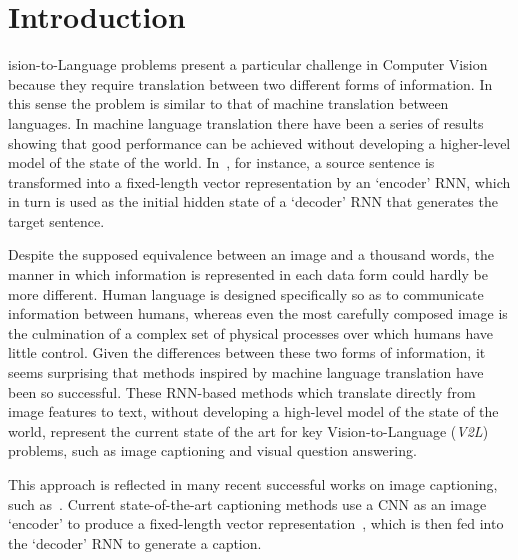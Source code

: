 \documentclass[10pt,journal,compsoc]{IEEEtran}
\def\V2L{\textit{V2L}}
\begin{document}
\IEEEdisplaynontitleabstractindextext
\IEEEpeerreviewmaketitle



\section{Introduction}
\label{sec:introduction}
ision-to-Language problems present a particular challenge in Computer Vision because they require translation between two different forms of information.  In this sense the problem is similar to that of machine translation between languages. In machine language translation there have been a series of results showing that good performance can be achieved without developing a higher-level model of the state of the world. In~\cite{bahdanau2014neural,cho2014learning,sutskever2014sequence}, for instance, a source sentence is transformed into a fixed-length vector representation by an `encoder' RNN, which in turn is used as the initial hidden state of a `decoder' RNN that generates the target sentence.

Despite the supposed equivalence between an image and  a thousand words, the
manner in which information is represented in each data form could hardly be
more different. Human language is designed specifically so as to communicate
information between humans, whereas even the most carefully composed image is
the culmination of a complex set of physical processes over which humans have
little control.  Given the differences between these two forms of information,
it seems surprising that methods inspired by machine language translation have
been so successful. These RNN-based methods which translate directly from image
features to text, without developing a high-level model of the state of the
world, represent the current state of the art for key Vision-to-Language (\V2L)
problems, such as image captioning and visual question answering.

This approach is reflected in many recent successful works on image captioning, such as~\cite{Chen2015CVPRMind,donahue2014long,karpathy2014deep,mao2014deep,vinyals2014show,yao2015describing,devlin2015language}.
Current state-of-the-art captioning methods use a CNN as an image `encoder' to produce a fixed-length vector representation~\cite{krizhevsky2012imagenet,lecun1998gradient,simonyan2014very,szegedy2014going}, which is then fed into the `decoder' RNN to generate a caption.
\end{document}
